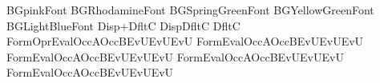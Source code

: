 BG{pink}Font{\sf}
BG{Rhodamine}Font{\sf}
BG{SpringGreen}Font{}
BG{YellowGreen}Font{}
BG{LightBlue}Font{}
Disp{+}Dflt{\cat C}
Disp{\times}Dflt{\cat C}
Dflt{\cat C}
Form{{\rm Opr}}Eval{\OprBinEvlPo}OccA{\occ}OccB{}EvU{\OprUniEvlPo}EvU{\OprUniEvlPo}EvU{\OprUniEvlPo}
Form{\catAddForm}Eval{\OprBinEvlIn}OccA{\occ}OccB{\occ}EvU{\OprUniEvlPr}EvU{\OprUniEvlPo}EvU{\OprUniEvlPo}
Form{\catMulForm}Eval{\OprBinEvlIn}OccA{\occ}OccB{\occ}EvU{\OprUniEvlPr}EvU{\OprUniEvlPo}EvU{\OprUniEvlPo}
Form{\catHomForm}Eval{\OprBinEvlIn}OccA{\occ}OccB{\occ}EvU{\OprUniEvlPr}EvU{\OprUniEvlPo}EvU{\OprUniEvlPo}
Form{\catHomForm}Eval{\OprBinEvlInS}OccA{\occ}OccB{\occ}EvU{\OprUniEvlPr}EvU{\OprUniEvlPo}EvU{\OprUniEvlPoS}


